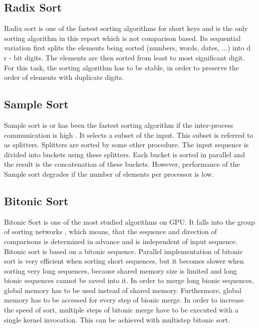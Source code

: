 \documentclass[conference]{IEEEtran}
\begin{document}
\subsection{Radix Sort}
Radix sort is one of the fastest sorting algorithms for short keys and is the only sorting algorithm in this report which is not comparison based. Its sequential variation first splits the elements being sorted (numbers, words, dates, ...) into d r - bit digits. The elements are then sorted from least to most significant digit. For this task, the sorting algorithm has to be stable, in order to preserve the order of elements with duplicate digits.

\subsection{Sample Sort}
Sample sort is or has been the fastest sorting algorithm if the inter-process communication is high . It selects a subset of the input. This subset is referred to as splitters. Splitters are sorted by some other procedure. The input sequence is divided into buckets using these splitters. Each bucket is sorted in parallel and the result is the concatenation of these buckets. However, performance of the Sample sort degrades if the number of elements per processor is low.

\subsection{Bitonic Sort}
Bitonic Sort is one of the most studied algorithms on GPU. It falls into the group of sorting networks , which means, that the sequence and direction of comparisons is determined in advance and is independent of input sequence. Bitonic sort is based on a bitonic sequence. Parallel implementation of bitonic sort is very efficient when sorting short sequences, but it becomes slower when sorting very long sequences, because shared memory size is limited and long bionic sequences cannot be saved into it. In order to merge long bionic sequences, global memory has to be used instead of shared memory. Furthermore, global memory has to be accessed for every step of bionic merge. In order to increase the speed of sort, multiple steps of bitonic merge have to be executed with a single kernel invocation. This can be achieved with multistep bitonic sort.\\
\end{document}
